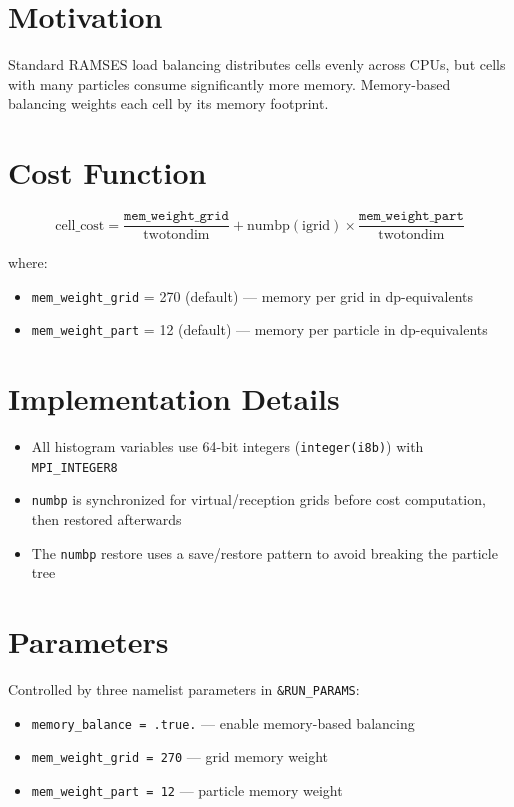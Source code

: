\documentclass[11pt,fleqn]{book}
\begin{document}
\section{Motivation}

Standard RAMSES load balancing distributes cells evenly across CPUs, but cells with many particles consume significantly more memory. Memory-based balancing weights each cell by its memory footprint.

\section{Cost Function}

\[
\text{cell\_cost} = \frac{\texttt{mem\_weight\_grid}}{\text{twotondim}} + \text{numbp}(\text{igrid}) \times \frac{\texttt{mem\_weight\_part}}{\text{twotondim}}
\]

where:
\begin{itemize}[leftmargin=2em]
  \item \texttt{mem\_weight\_grid} = 270 (default) --- memory per grid in dp-equivalents
  \item \texttt{mem\_weight\_part} = 12 (default) --- memory per particle in dp-equivalents
\end{itemize}

\section{Implementation Details}

\begin{itemize}[leftmargin=2em]
  \item All histogram variables use 64-bit integers (\texttt{integer(i8b)}) with \texttt{MPI\_INTEGER8}
  \item \texttt{numbp} is synchronized for virtual/reception grids before cost computation, then restored afterwards
  \item The \texttt{numbp} restore uses a save/restore pattern to avoid breaking the particle tree
\end{itemize}

\section{Parameters}

Controlled by three namelist parameters in \texttt{\&RUN\_PARAMS}:
\begin{itemize}[leftmargin=2em]
  \item \texttt{memory\_balance = .true.} --- enable memory-based balancing
  \item \texttt{mem\_weight\_grid = 270} --- grid memory weight
  \item \texttt{mem\_weight\_part = 12} --- particle memory weight
\end{itemize}
\end{document}
